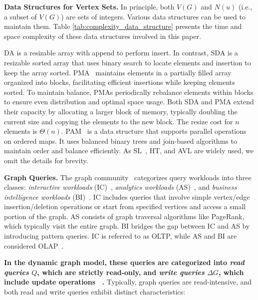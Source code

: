 \vspace{2pt}
\noindent\textbf{Data Structures for Vertex Sets.} In principle, both $V(G)$ and $N(u)$ (i.e., a subset of $V(G)$) are sets of integers. Various data structures can be used to maintain them. Table \ref{tab:complexity_data_structure} presents the time and space complexity of these data structures involved in this paper.

DA is a resizable array with append to perform insert. In contrast, SDA is a resizable sorted array that uses binary search to locate elements and insertion to keep the array sorted. PMA~\cite{bender2007adaptive,de2019packed} maintains elements in a partially filled array organized into blocks, facilitating efficient insertions while keeping elements sorted. To maintain balance, PMAs periodically rebalance elements within blocks to ensure even distribution and optimal space usage. Both SDA and PMA extend their capacity by allocating a larger block of memory, typically doubling the current size and copying the elements to the new block. The resize cost for $n$ elements is $\Theta (n)$. PAM~\cite{sun2018pam} is a data structure that supports parallel operations on ordered maps. It uses balanced binary trees and join-based algorithms to maintain order and balance efficiently. As SL~\cite{pugh1990skip}, HT, and AVL are widely used, we omit the details for brevity.

\vspace{2pt}
\noindent\textbf{Graph Queries.} The graph community~\cite{angles2014linked,besta2023demystifying} categorizes query workloads into three classes: \emph{interactive workloads} (IC)~\cite{erling2015ldbc}, \emph{analytics workloads} (AS)~\cite{iosup2016ldbc}, and \emph{business intelligence workloads} (BI)~\cite{szarnyas2022ldbc}. IC includes queries that involve simple vertex/edge insertion/deletion operations or start from specified vertices and access a small portion of the graph. AS consists of graph traversal algorithms like PageRank, which typically visit the entire graph. BI bridges the gap between IC and AS by introducing pattern queries. IC is referred to as OLTP, while AS and BI are considered OLAP~\cite{li2022bytegraph,besta2023graph}.


\textbf{In the dynamic graph model, these queries are categorized into \emph{read queries} $Q$, which are strictly read-only, and \emph{write queries} $\Delta G$, which include update operations ~\cite{fuchs2022sortledton,li2022bytegraph}.} Typically, graph queries are read-intensive, and both read and write queries exhibit distinct characteristics:


